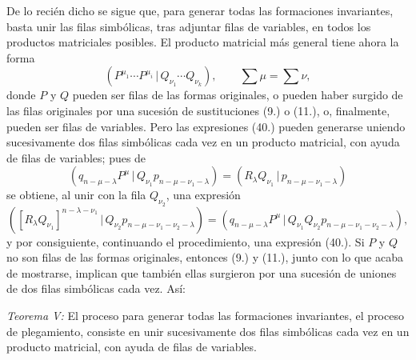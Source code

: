 \documentclass[11pt]{article}
\newcommand{\pair}[2]{(#1\,|\,#2)}
\begin{document}
De lo recién dicho se sigue que, para generar todas las formaciones invariantes, basta unir las filas simbólicas, tras adjuntar filas de variables, en todos los productos matriciales posibles. El producto matricial más general tiene ahora la forma
\begin{equation}
 \pair{P^{\mu_1}\cdots P^{\mu_i}}{Q_{\nu_1}\cdots Q_{\nu_k}},\qquad \sum\mu=\sum\nu,
\tag{40}
\end{equation}
donde $P$ y $Q$ pueden ser filas de las formas originales, o pueden haber surgido de las filas originales por una sucesión de sustituciones (9.) o (11.), o, finalmente, pueden ser filas de variables. Pero las expresiones (40.) pueden generarse uniendo sucesivamente dos filas simbólicas cada vez en un producto matricial, con ayuda de filas de variables; pues de
\[
 \pair{q_{n-\mu-\lambda}P^\mu}{Q_{\nu_1}p_{n-\mu-\nu_1-\lambda}}=\pair{R_\lambda Q_{\nu_1}}{p_{n-\mu-\nu_1-\lambda}}
\]
se obtiene, al unir con la fila $Q_{\nu_2}$, una expresión
\[
 \pair{[R_\lambda Q_{\nu_1}]^{n-\lambda-\nu_1}}{Q_{\nu_2}p_{n-\mu-\nu_1-\nu_2-\lambda}}
 =\pair{q_{n-\mu-\lambda}P^\mu}{Q_{\nu_1}Q_{\nu_2}p_{n-\mu-\nu_1-\nu_2-\lambda}},
\]
y por consiguiente, continuando el procedimiento, una expresión (40.). Si $P$ y $Q$ no son filas de las formas originales, entonces (9.) y (11.), junto con lo que acaba de mostrarse, implican que también ellas surgieron por una sucesión de uniones de dos filas simbólicas cada vez. Así:

\emph{Teorema V:} El proceso para generar todas las formaciones invariantes, el proceso de plegamiento, consiste en unir sucesivamente dos filas simbólicas cada vez en un producto matricial, con ayuda de filas de variables.
\end{document}
